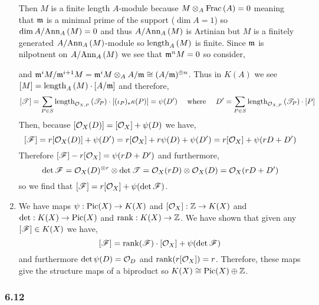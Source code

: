 \documentclass[12pt]{article}
\begin{document}
\begin{enumerate}
Then $M$ is a finite length $A$-module because $M \otimes_A \mathrm{Frac}\left(A\right) = 0$ meaning that $\mathfrak{m}$ is a minimal prime of the support ($\dim{A} = 1$) so $\dim{A / \mathrm{Ann}_{A}\left(M\right)} = 0$ and thus $A / \mathrm{Ann}_{A}\left(M\right)$ is Artinian but $M$ is a finitely generated $A / \mathrm{Ann}_{A}\left(M\right)$-module so $\mathrm{length}_{A}\left( M \right)$ is finite. Since $\mathfrak{m}$ is nilpotnent on $A/\mathrm{Ann}_{A}\left(M\right)$ we see that $\mathfrak{m}^n M = 0$ so consider,
\begin{center}
\end{center}
and $\mathfrak{m}^i M / \mathfrak{m}^{i+1} M = \mathfrak{m}^i M \otimes_A A / \mathfrak{m} \cong (A / \mathfrak{m})^{\oplus n}$. Thus in $K(A)$ we see $[M] = \mathrm{length}_{A}\left( M \right) \cdot [A/\mathfrak{m}]$ and therefore,
\[ [\mathscr{T}] = \sum_{P \in S} \mathrm{length}_{\mathcal{O}_{X, P}}\left( \mathscr{T}_P \right) \cdot [(\iota_P)_* \kappa(P)] = \psi(D') \quad \text{ where } \quad D' = \sum_{P \in S} \mathrm{length}_{\mathcal{O}_{X, P}}\left( \mathscr{T}_P \right) \cdot [P] \]
Then, because $[\mathcal{O}_{X}(D)] = [\mathcal{O}_{X}] + \psi(D)$ we have,
\[ [\mathscr{F}] = r [\mathcal{O}_{X}(D)] + \psi(D') = r [\mathcal{O}_{X}] + r \psi(D) + \psi(D') = r [\mathcal{O}_{X}] + \psi(r D + D') \]
Therefore $[\mathscr{F}] - r [\mathcal{O}_{X}] = \psi(rD + D')$ and furthermore, 
\[ \det{\mathscr{F}} = \mathcal{O}_{X}(D)^{\otimes r} \otimes \det{\mathscr{T}} = \mathcal{O}_{X}(rD) \otimes \mathcal{O}_{X}(D) = \mathcal{O}_{X}(rD + D') \]
so we find that $[\mathscr{F}] = r [\mathcal{O}_{X}] + \psi(\det{\mathscr{F}})$.

\item We have maps $\psi : \mathrm{Pic}(X) \to K(X)$ and $[\mathcal{O}_{X}] : \mathbb{Z} \to K(X)$ and $\det : K(X) \to \mathrm{Pic}(X)$ and $\mathrm{rank} : K(X) \to \mathbb{Z}$. We have shown that given any $[\mathscr{F}] \in K(X)$ we have,
\[ [\mathscr{F}] = \mathrm{rank}{(\mathscr{F})} \cdot [\mathcal{O}_{X}] + \psi(\det{\mathscr{F}}) \]
and furthermore $\det{\psi(D)} = \mathcal{O}_{D}$ and $\mathrm{rank}{(r [\mathcal{O}_{X}])} = r$. Therefore, these maps give the structure maps of a biproduct so $K(X) \cong \mathrm{Pic}(X) \oplus \mathbb{Z}$. 
\end{enumerate}

\subsubsection{6.12}
\end{document}
